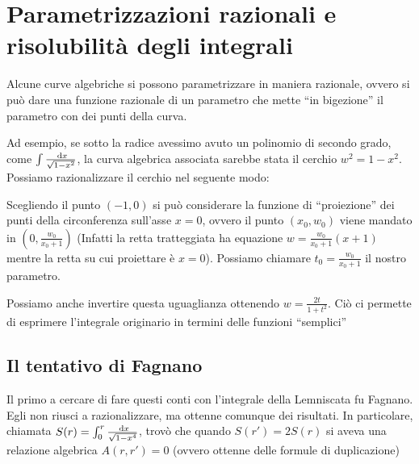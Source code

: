 
\section{Parametrizzazioni razionali e risolubilità degli integrali}
Alcune curve algebriche si possono parametrizzare in maniera razionale, ovvero si può dare una funzione razionale di un parametro che mette ``in bigezione'' il parametro con dei punti della curva.

Ad esempio, se sotto la radice avessimo avuto un polinomio di secondo grado, come $ \int \frac{\text{ d} x}{\sqrt{1 - x^2}} $, la curva algebrica
associata sarebbe stata il cerchio $w^2 = 1 - x^2$. Possiamo razionalizzare il cerchio nel seguente modo:

Scegliendo il punto $(-1, 0)$ si può considerare la funzione di ``proiezione'' dei punti della circonferenza sull'asse $x=0$, ovvero il
punto $(x_0, w_0)$ viene mandato in $(0, \frac{w_0}{x_0 + 1})$ (Infatti la retta tratteggiata ha equazione $w = \frac{w_0}{x_0 + 1} (x + 1)$
mentre la retta su cui proiettare è $x=0$). Possiamo chiamare $t_0 = \frac{w_0}{x_0 + 1}$ il nostro parametro.

Possiamo anche invertire questa uguaglianza ottenendo $w = \frac{2 t}{1 + t^2}$. Ciò ci permette di esprimere l'integrale originario in termini delle funzioni ``semplici''


\subsection{Il tentativo di Fagnano}
Il primo a cercare di fare questi conti con l'integrale della Lemniscata fu Fagnano. Egli non riusci a razionalizzare, ma ottenne comunque dei risultati. In particolare, chiamata $S(r) = \int_0^r \frac{\text{ d} x}{\sqrt{1 - x^4}}$, trovò che quando $S(r') = 2 S(r)$ si aveva una relazione algebrica $A(r, r') = 0$ (ovvero ottenne delle formule di duplicazione)


